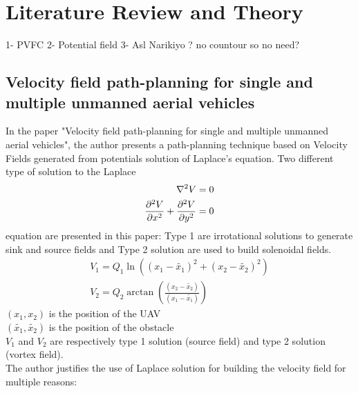 \section{Literature Review and Theory}
1- PVFC
2- Potential field
3- Asl Narikiyo ? no countour so no need?
\subsection{Velocity field path-planning for single and multiple unmanned aerial vehicles}
In the paper "Velocity field path-planning for single and multiple unmanned aerial vehicles", the author presents a path-planning technique based on Velocity Fields generated from potentials solution of Laplace's equation.
Two different type of solution to the Laplace 
\begin{align} %
    \laplacian{V} &=0 \nonumber \\
    \frac{\partial^2 V}{\partial x^2}+\dpd[2]{V}{y} &=0 \label{eq:Laplace} %
\end{align}
equation are presented in this paper: Type 1 are irrotational solutions to generate sink and source fields and Type 2 solution are used to build solenoidal fields.
\begin{align} %
    {V}_{1} = {Q}_{1} \ln(({x}_{1}-\tilde{{x}_{1}})^2+({x}_{2}-\tilde{{x}_{2}})^2) \\
    {V}_{2} = {Q}_{2} \arctan(\frac{({x}_{2}-\tilde{{x}_{2}})}{({x}_{1}-\tilde{{x}_{1}})})
\end{align}
$({x}_{1},{x}_{2})$ is the position of the UAV\\
$(\tilde{{x}_{1}}, \tilde{{x}_{2}})$ is the position of the obstacle\\
${V}_{1}$ and ${V}_{2}$ are respectively type 1 solution (source field) and type 2 solution (vortex field). \\
The author justifies the use of Laplace solution for building the velocity field for multiple reasons:
